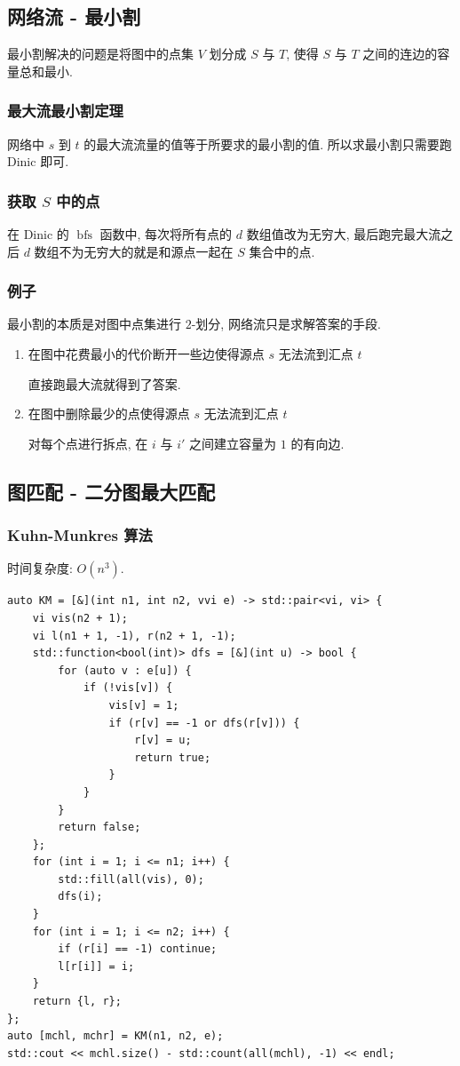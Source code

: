 \documentclass[UTF8, a4paper, titlepage, twoside]{ctexart}
\begin{document}
\subsection{ 网络流 - 最小割 }
最小割解决的问题是将图中的点集 $V$ 划分成 $S$ 与 $T$, 使得 $S$ 与 $T$ 之间的连边的容量总和最小. 
\subsubsection{ 最大流最小割定理 }
网络中 $s$  到 $t$ 的最大流流量的值等于所要求的最小割的值. 所以求最小割只需要跑 Dinic 即可. 
\subsubsection{ 获取 $S$ 中的点 }
在 Dinic 的 $\operatorname{bfs}$ 函数中, 每次将所有点的 $d$ 数组值改为无穷大, 最后跑完最大流之后 $d$ 数组不为无穷大的就是和源点一起在 $S$ 集合中的点.  
\subsubsection{ 例子 }
最小割的本质是对图中点集进行 $2$-划分, 网络流只是求解答案的手段. 
\begin{enumerate}
	\item 在图中花费最小的代价断开一些边使得源点 $s$ 无法流到汇点 $t$

    直接跑最大流就得到了答案. 
    
    \item 在图中删除最少的点使得源点 $s$ 无法流到汇点 $t$

    对每个点进行拆点, 在 $i$ 与 $i'$ 之间建立容量为 $1$ 的有向边. 

\end{enumerate}

\subsection{ 图匹配 - 二分图最大匹配 }
\subsubsection{ Kuhn-Munkres 算法 }
时间复杂度: $O(n^3)$.
\begin{lstlisting}[style=cpp]
auto KM = [&](int n1, int n2, vvi e) -> std::pair<vi, vi> {
    vi vis(n2 + 1);
    vi l(n1 + 1, -1), r(n2 + 1, -1);
    std::function<bool(int)> dfs = [&](int u) -> bool {
        for (auto v : e[u]) {
            if (!vis[v]) {
                vis[v] = 1;
                if (r[v] == -1 or dfs(r[v])) {
                    r[v] = u;
                    return true;
                }
            }
        }
        return false;
    };
    for (int i = 1; i <= n1; i++) {
        std::fill(all(vis), 0);
        dfs(i);
    }
    for (int i = 1; i <= n2; i++) {
        if (r[i] == -1) continue;
        l[r[i]] = i;
    }
    return {l, r};
};
auto [mchl, mchr] = KM(n1, n2, e);
std::cout << mchl.size() - std::count(all(mchl), -1) << endl;
\end{lstlisting}
\end{document}
